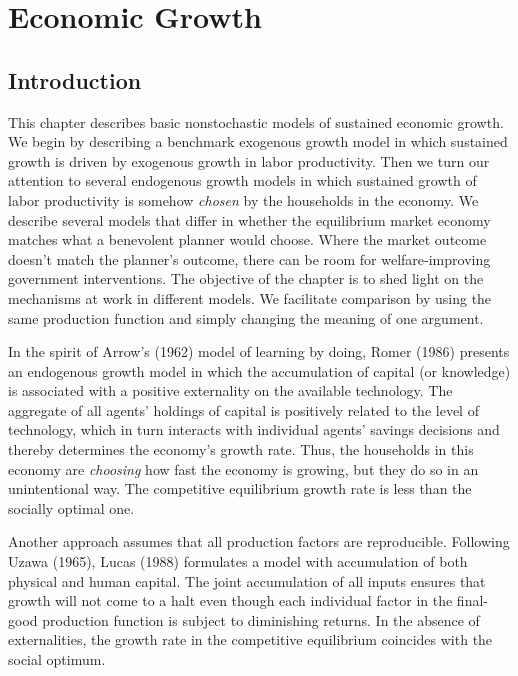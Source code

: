 

%


\showchaptIDtrue
\def\@chaptID{11.}



\def\toone{{t+1}}
\def\ttwo{{t+2}}
\def\tthree{{t+3}}
\def\Tone{{T+1}}
\def\TTT{{T-1}}
\def\rtr{{\rm tr}}
\chapter{Economic Growth\label{growth}}

\section{Introduction}

This chapter describes basic nonstochastic models of sustained
economic growth.   We begin by describing a
 benchmark exogenous  growth model in which sustained growth
is driven by exogenous growth in labor productivity.
Then we turn our attention to several   endogenous growth
 models in which sustained growth of labor   productivity
is somehow {\it chosen\/} by the households in the economy.
We describe several models that differ in whether the
equilibrium market economy matches what a benevolent planner
would choose.   Where the market outcome doesn't match
the planner's outcome, there can be room   for welfare-improving
government interventions. The objective of the chapter is to
shed light on the mechanisms at work in different models.
We  facilitate comparison by using the same production
function  and simply changing the meaning
of one  argument.


%
In the spirit of Arrow's (1962)
%
model of learning by doing, Romer (1986) presents an endogenous
growth model in which the accumulation of capital (or knowledge) is
associated with a positive externality on the available technology.
The aggregate of all agents' holdings of capital
is positively related to the level of technology, which
in turn interacts with individual agents' savings decisions
and thereby determines the economy's growth rate.
Thus, the households in this economy are {\it choosing\/} how
fast the economy is growing, but they do so in an unintentional way.
The competitive equilibrium growth rate is less than  the
socially optimal one.

Another approach assumes
that all production factors are reproducible. Following Uzawa (1965),
%
Lucas (1988)
%
formulates a model with accumulation of both physical
and human capital. The joint accumulation of all inputs
ensures that growth will not come to a halt
even though each individual factor in the final-good
production function is subject to
diminishing returns. In the absence of externalities,
the growth rate in the competitive equilibrium
coincides with the social optimum.

